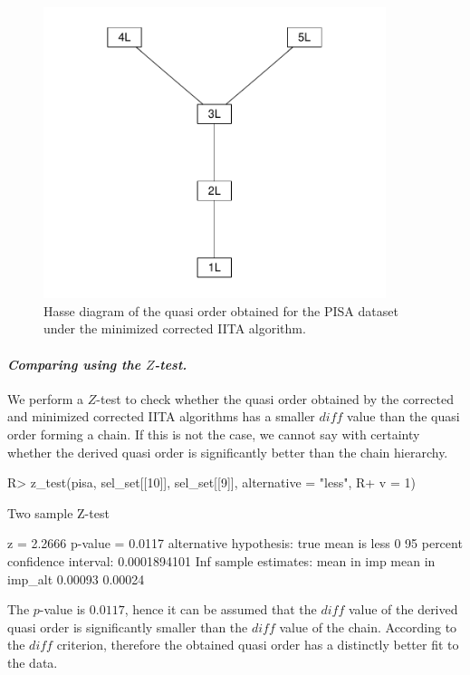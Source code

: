 \documentclass[nojss]{jss}
\begin{document}
\begin{center}
\begin{figure}[h!]
\centering
\includegraphics[width=10cm]{hasse_pisa.pdf}
\caption{Hasse diagram of the quasi order obtained for the PISA dataset under the minimized corrected IITA algorithm.}
\label{fig:1}
\end{figure}  
\end{center}

\paragraph{\it Comparing using the $Z$-test.}
We perform a $Z$-test to check whether the quasi order obtained by the corrected and minimized corrected IITA algorithms has a smaller $\mathit{diff}$ value than the quasi order forming a chain. 
If this is not the case, we cannot say with certainty whether the derived quasi order is significantly 
better than the chain hierarchy.
\begin{Schunk}
\begin{Sinput}
R> z_test(pisa, sel_set[[10]], sel_set[[9]], alternative = "less", 
R+    v = 1)
\end{Sinput}
\begin{Soutput}
 	 Two sample Z-test

z =  2.2666  p-value =  0.0117  
alternative hypothesis: true mean is less 0  
95 percent confidence interval:
  0.0001894101 Inf
sample estimates:
    mean in imp mean in imp_alt 
        0.00093         0.00024 
\end{Soutput}
\end{Schunk}
The $p$-value is $0.0117$, hence it can be assumed that the $\mathit{diff}$ value 
of the derived quasi order is significantly smaller than the $\mathit{diff}$ value 
of the chain. According to the $\mathit{diff}$ criterion, therefore the obtained quasi 
order has a distinctly better fit to the data.
\end{document}
